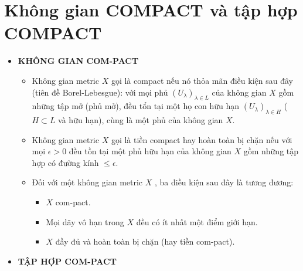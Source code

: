 \documentclass[12pt,a4paper]{article}
\begin{document}
\section{Không gian COMPACT và tập hợp COMPACT}

{\renewcommand{\labelitemi}{$\blacksquare$}
\renewcommand\labelitemii{$\nabla$}
\renewcommand\labelitemiii{$\square$}
\begin{itemize}
  \item \textbf{KHÔNG GIAN COM-PACT}\\
  \begin{itemize}
  \item Không gian metric $X$ gọi là {\color{red}compact} nếu nó thỏa mãn điều kiện sau đây (tiên đề Borel-Lebesgue): với mọi phủ $(U_{\lambda})_{\lambda \in L} $ của không gian $X$ gồm những tập mở (phủ mở), đều tổn tại một họ con hữu hạn $(U_{\lambda})_{\lambda \in H} $ ($H \subset L$ và hữu hạn), cùng là một phủ của không gian $X$.\\
  
  \item Không gian metric $X$ gọi là {\color{red}tiền compact} hay hoàn toàn bị chặn nếu với mọi $\epsilon > 0$ đều tồn tại một phủ hữu hạn của không gian $X$ gồm những tập hợp có đường kính $\leqslant \epsilon$.\\
  
  \item Đối với một không gian metric $X$ , ba điều kiện sau đây là tương đương: \\
  \begin{itemize}
  \item $X$ com-pact.
  \item Mọi dãy vô hạn trong $X$ đều có ít nhất một điểm giới hạn.
  \item $X$ đầy đủ và hoàn toàn bị chặn (hay tiền com-pact).\\
  \end{itemize} 
  \end{itemize}
  \pagebreak
  \item \textbf{TẬP HỢP COM-PACT}\\
  

\end{itemize}}
\end{document}
